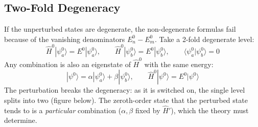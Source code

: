 \documentclass[11pt,a4paper]{article}
\begin{document}
\subsection{Two-Fold Degeneracy}
If the unperturbed states are degenerate, the non-degenerate formulas fail because of the vanishing denominators $E_n^0-E_m^0$. Take a 2-fold degenerate level:
\[
\hat H^0|\psi_a^0\rangle = E^0|\psi_a^0\rangle, \qquad \hat H^0|\psi_b^0\rangle = E^0|\psi_b^0\rangle, \qquad \langle\psi_a^0|\psi_b^0\rangle = 0
\]
Any combination is also an eigenstate of $\hat H^0$ with the same energy:
\[
|\psi^0\rangle = \alpha|\psi_a^0\rangle + \beta|\psi_b^0\rangle, \qquad \hat H^0|\psi^0\rangle = E^0|\psi^0\rangle
\]
The perturbation breaks the degeneracy: as it is switched on, the single level splits into two (figure below). The zeroth-order state that the perturbed state tends to is a \textit{particular} combination ($\alpha,\beta$ fixed by $\hat H'$), which the theory must determine.

\begin{center}
\end{center}
\end{document}
